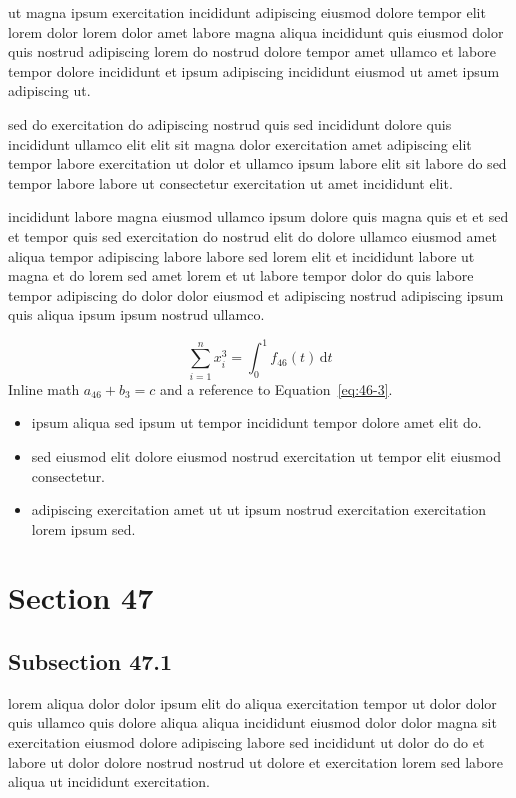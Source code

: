 \documentclass{article}
\begin{document}
ut magna ipsum exercitation incididunt adipiscing eiusmod dolore tempor elit lorem dolor lorem dolor amet labore magna aliqua incididunt quis eiusmod dolor quis nostrud adipiscing lorem do nostrud dolore tempor amet ullamco et labore tempor dolore incididunt et ipsum adipiscing incididunt eiusmod ut amet ipsum adipiscing ut.

sed do exercitation do adipiscing nostrud quis sed incididunt dolore quis incididunt ullamco elit elit sit magna dolor exercitation amet adipiscing elit tempor labore exercitation ut dolor et ullamco ipsum labore elit sit labore do sed tempor labore labore ut consectetur exercitation ut amet incididunt elit.

incididunt labore magna eiusmod ullamco ipsum dolore quis magna quis et et sed et tempor quis sed exercitation do nostrud elit do dolore ullamco eiusmod amet aliqua tempor adipiscing labore labore sed lorem elit et incididunt labore ut magna et do lorem sed amet lorem et ut labore tempor dolor do quis labore tempor adipiscing do dolor dolor eiusmod et adipiscing nostrud adipiscing ipsum quis aliqua ipsum ipsum nostrud ullamco.

\begin{equation}\label{eq:46-3}
  \sum_{i=1}^{n} x_i^{3} = \int_0^1 f_{46}(t)\,\mathrm{d}t
\end{equation}
Inline math $a_{46} + b_{3} = c$ and a reference to Equation~\eqref{eq:46-3}.

\begin{itemize}
  \item ipsum aliqua sed ipsum ut tempor incididunt tempor dolore amet elit do.
  \item sed eiusmod elit dolore eiusmod nostrud exercitation ut tempor elit eiusmod consectetur.
  \item adipiscing exercitation amet ut ut ipsum nostrud exercitation exercitation lorem ipsum sed.
\end{itemize}

\section{Section 47}\label{sec:47}
\subsection{Subsection 47.1}\label{sec:47-1}
lorem aliqua dolor dolor ipsum elit do aliqua exercitation tempor ut dolor dolor quis ullamco quis dolore aliqua aliqua incididunt eiusmod dolor dolor magna sit exercitation eiusmod dolore adipiscing labore sed incididunt ut dolor do do et labore ut dolor dolore nostrud nostrud ut dolore et exercitation lorem sed labore aliqua ut incididunt exercitation.
\end{document}

